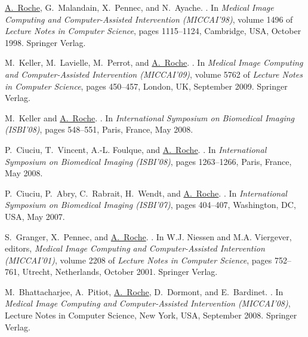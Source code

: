 \begin{thebibliography}{100}
\underline{A.~Roche}, G.~Malandain, X.~Pennec, and N.~Ayache.
.
\newblock In {\em Medical Image Computing and Computer-Assisted Intervention
  (MICCAI'98)}, volume 1496 of {\em Lecture Notes in Computer Science}, pages
  1115--1124, Cambridge, USA, October 1998. Springer Verlag.

M.~Keller, M.~Lavielle, M.~Perrot, and \underline{A.~Roche}.
.
\newblock In {\em Medical Image Computing and Computer-Assisted Intervention
  (MICCAI'09)}, volume 5762 of {\em Lecture Notes in Computer Science}, pages
  450--457, London, UK, September 2009. Springer Verlag.

M.~Keller and \underline{A.~Roche}.
.
\newblock In {\em International Symposium on Biomedical Imaging (ISBI'08)},
  pages 548--551, Paris, France, May 2008.

P.~Ciuciu, T.~Vincent, A.-L. Foulque, and \underline{A.~Roche}.
.
\newblock In {\em International Symposium on Biomedical Imaging (ISBI'08)},
  pages 1263--1266, Paris, France, May 2008.

P.~Ciuciu, P.~Abry, C.~Rabrait, H.~Wendt, and \underline{A.~Roche}.
.
\newblock In {\em International Symposium on Biomedical Imaging (ISBI'07)},
  pages 404--407, Washington, DC, USA, May 2007.

S.~Granger, X.~Pennec, and \underline{A.~Roche}.
.
\newblock In W.J. Niessen and M.A. Viergever, editors, {\em Medical Image
  Computing and Computer-Assisted Intervention (MICCAI'01)}, volume 2208 of
  {\em Lecture Notes in Computer Science}, pages 752--761, Utrecht,
  Netherlands, October 2001. Springer Verlag.

M.~Bhattacharjee, A.~Pitiot, \underline{A.~Roche}, D.~Dormont, and E.~Bardinet.
.
\newblock In {\em Medical Image Computing and Computer-Assisted Intervention
  (MICCAI'08)}, Lecture Notes in Computer Science, New York, USA, September
  2008. Springer Verlag.


\end{thebibliography}
